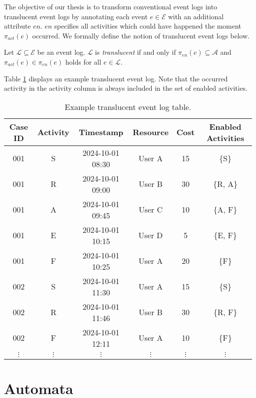 The objective of our thesis is to transform conventional event logs into translucent event logs by annotating each event $e \in \mathcal{E}$ with an additional attribute $en$. $en$ specifies all activities which could have happened the moment $\pi_{act}(e)$ occurred. We formally define the notion of translucent event logs below.

\begin{definition}
    Let $\mathcal{L} \subseteq \mathcal{E}$ be an event log. $\mathcal{L}$ is \emph{translucent} if and only if $\pi_{en}(e) \subseteq \mathcal{A}$ and $\pi_{act}(e) \in \pi_{en}(e)$ holds for all $e \in \mathcal{L}$.
\end{definition}

Table \ref{tab:translucent_event_log} displays an example translucent event log. Note that the occurred activity in the activity column is always included in the set of enabled activities.

\renewcommand{\arraystretch}{1.25}
\begin{table}[h]
    \centering
    \caption{Example translucent event log table.}
    \begin{tabular}{|c|c|c|c|c|c|}
        \hline
        \textbf{Case ID} & \textbf{Activity} & \textbf{Timestamp} & \textbf{Resource} & \textbf{Cost} & \textbf{Enabled Activities} \\ 
        \hline
        001 & S  & 2024-10-01 08:30 & User A & 15 & \{S\}\\ 
        001 & R    & 2024-10-01 09:00 & User B & 30 & \{R, A\}\\ 
        001 & A & 2024-10-01 09:45 & User C & 10 & \{A, F\}\\ 
        001 & E     & 2024-10-01 10:15 & User D & 5  & \{E, F\}\\ 
        001 & F & 2024-10-01 10:25 & User A & 20 & \{F\}\\
        002 & S  & 2024-10-01 11:30 & User A & 15 & \{S\}\\ 
        002 & R    & 2024-10-01 11:46 & User B & 30 & \{R, F\}\\ 
        002 & F & 2024-10-01 12:11 & User A & 10 & \{F\}\\ 
        $\vdots$ & $\vdots$ & $\vdots$ & $\vdots$ & $\vdots$ & $\vdots$ \\
        \hline
    \end{tabular}
    \label{tab:translucent_event_log}
\end{table}


\section{Automata}


